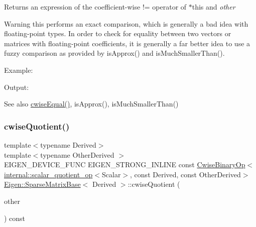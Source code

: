 \begin{DoxyReturn}{Returns}
an expression of the coefficient-\/wise != operator of $\ast$this and {\itshape other} 
\end{DoxyReturn}
\begin{DoxyWarning}{Warning}
this performs an exact comparison, which is generally a bad idea with floating-\/point types. In order to check for equality between two vectors or matrices with floating-\/point coefficients, it is generally a far better idea to use a fuzzy comparison as provided by is\+Approx() and is\+Much\+Smaller\+Than().
\end{DoxyWarning}
Example\+: 
\begin{DoxyCodeInclude}{0}
\end{DoxyCodeInclude}
 Output\+: 
\begin{DoxyVerbInclude}
\end{DoxyVerbInclude}


\begin{DoxySeeAlso}{See also}
\mbox{\hyperlink{class_eigen_1_1_sparse_matrix_base_aa55947922b1a537dbcfa857b48625a58}{cwise\+Equal()}}, is\+Approx(), is\+Much\+Smaller\+Than() 
\end{DoxySeeAlso}
\mbox{\label{class_eigen_1_1_sparse_matrix_base_ac8065bebfa7102bc138a177b1209e86f}} 
\subsubsection{\texorpdfstring{cwiseQuotient()}{cwiseQuotient()}}
{\footnotesize\ttfamily template$<$typename Derived$>$ \\
template$<$typename Other\+Derived $>$ \\
E\+I\+G\+E\+N\+\_\+\+D\+E\+V\+I\+C\+E\+\_\+\+F\+U\+NC E\+I\+G\+E\+N\+\_\+\+S\+T\+R\+O\+N\+G\+\_\+\+I\+N\+L\+I\+NE const \mbox{\hyperlink{class_eigen_1_1_cwise_binary_op}{Cwise\+Binary\+Op}}$<$\mbox{\hyperlink{struct_eigen_1_1internal_1_1scalar__quotient__op}{internal\+::scalar\+\_\+quotient\+\_\+op}}$<$Scalar$>$, const Derived, const Other\+Derived$>$ \mbox{\hyperlink{class_eigen_1_1_sparse_matrix_base}{Eigen\+::\+Sparse\+Matrix\+Base}}$<$ Derived $>$\+::cwise\+Quotient (\begin{DoxyParamCaption}\item[{const E\+I\+G\+E\+N\+\_\+\+C\+U\+R\+R\+E\+N\+T\+\_\+\+S\+T\+O\+R\+A\+G\+E\+\_\+\+B\+A\+S\+E\+\_\+\+C\+L\+A\+SS$<$ Other\+Derived $>$ \&}]{other }\end{DoxyParamCaption}) const\hspace{0.3cm}{\ttfamily [inline]}}

